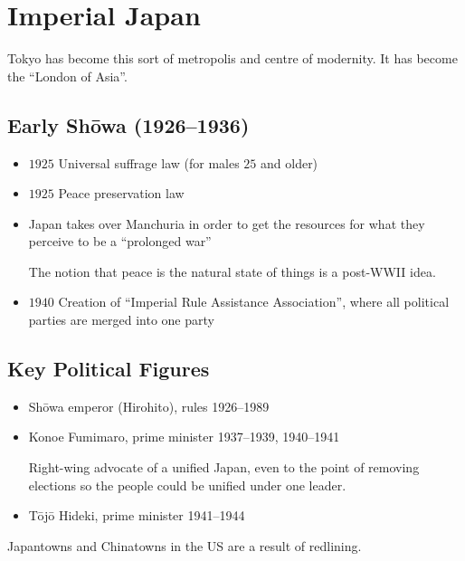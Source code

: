 \documentclass[class=article, crop=false]{standalone}
\begin{document}
	\section{Imperial Japan}
	\begin{note}{}
	  Tokyo has become this sort of metropolis and centre of modernity. It has become the ``London of Asia''.
	\end{note}
	\subsection{Early Sh\=owa (1926--1936)}
	\begin{itemize}
		\item $1925$ Universal suffrage law (for males $25$ and older)
		\item $1925$ Peace preservation law
    \item Japan takes over Manchuria in order to get the resources for what they perceive to be a ``prolonged war''
    \begin{note}{}
      The notion that peace is the natural state of things is a post-WWII idea.
    \end{note}
    \item $1940$ Creation of ``Imperial Rule Assistance Association'', where all political parties are merged into one party
	\end{itemize}
  \subsection{Key Political Figures}
  \begin{itemize}
    \item Sh\=owa emperor (Hirohito), rules 1926--1989
    \item Konoe Fumimaro, prime minister 1937--1939, 1940--1941
    \begin{note}{}
      Right-wing advocate of a unified Japan, even to the point of removing elections so the people could be unified under one leader.
    \end{note}
    \item T\=oj\=o Hideki, prime minister 1941--1944
  \end{itemize}
  Japantowns and Chinatowns in the US are a result of redlining.
\end{document}
